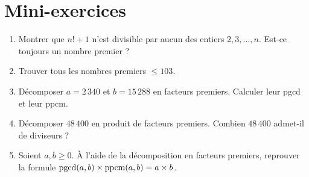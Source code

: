 \section*{Mini-exercices}

\begin{frame}
\begin{miniexercice}
\begin{enumerate}
  \item Montrer que $n!+1$ n'est divisible par aucun des entiers $2,3,\ldots,n$. Est-ce toujours un nombre premier ?
  \item Trouver tous les nombres premiers $\le 103$.
  \item Décomposer $a=2\,340$ et $b=15\,288$ en facteurs premiers. Calculer leur pgcd et leur ppcm.
  \item Décomposer $48\,400$ en produit de facteurs premiers. Combien $48\,400$ admet-il de diviseurs ?
  \item Soient $a,b \ge 0$. \`A l'aide de la décomposition en facteurs premiers, 
reprouver la formule
$\mathop{\text{pgcd}}\nolimits(a,b) \times \text{ppcm}(a,b) = a \times b$.
\end{enumerate}  
\end{miniexercice}
\end{frame}


